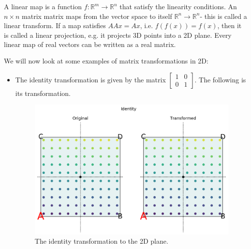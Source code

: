 \documentclass[a4paper, openany]{memoir}
\begin{document}
    A linear map is a function $f: \mathbb{R}^m \to \mathbb{R}^n$ that satisfy the linearity conditions. An $n \times n$ matrix matrix maps from the vector space to itself $\mathbb{R}^n \to \mathbb{R}^n$- this is called a linear transform. If a map satisfies $AAx = Ax$, i.e. $f(f(x)) = f(x)$, then it is called a linear projection, e.g. it projects 3D points into a 2D plane. Every linear map of real vectors can be written as a real matrix.

    We will now look at some examples of matrix transformations in 2D:
    \begin{itemize}
        \item The identity transformation is given by the matrix $\begin{bmatrix}
            1 & 0 \\
            0 & 1
        \end{bmatrix}$. The following is its transformation.
        \begin{figure}[H]
            \centering
            \includegraphics[scale=0.5]{src/3.10 IdentityTransformation.png}
            \caption{The identity transformation to the 2D plane.}
        \end{figure}    
        

\end{itemize}
\end{document}
